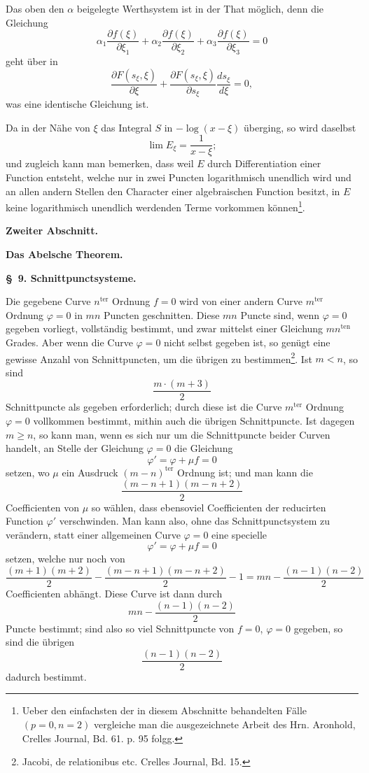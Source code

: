 \documentclass[10pt]{article}
\begin{document}
Das oben den $\alpha$ beigelegte Werthsystem ist in der That möglich, denn die Gleichung
\[
\alpha_1\frac{\partial f(\xi)}{\partial \xi_1}+\alpha_2\frac{\partial f(\xi)}{\partial \xi_2}+\alpha_3\frac{\partial f(\xi)}{\partial \xi_3}=0
\]
geht über in
\[
\frac{\partial F(s_\xi,\xi)}{\partial \xi}
+\frac{\partial F(s_\xi,\xi)}{\partial s_\xi}\frac{ds_\xi}{d\xi}=0,
\]
was eine identische Gleichung ist.

Da in der Nähe von $\xi$ das Integral $S$ in $-\log(x-\xi)$ überging, so wird daselbst
\[
\lim E_\xi=\frac{1}{x-\xi};
\]
und zugleich kann man bemerken, dass weil $E$ durch Differentiation einer Function entsteht, welche nur in zwei Puncten logarithmisch unendlich wird und an allen andern Stellen den Character einer algebraischen Function besitzt, in $E$ keine logarithmisch unendlich werdenden Terme vorkommen können\footnote{Ueber den einfachsten der in diesem Abschnitte behandelten Fälle $(p=0,n=2)$ vergleiche man die ausgezeichnete Arbeit des Hrn. Aronhold, Crelles Journal, Bd. 61. p. 95 folgg.}.

\clearpage

\begin{center}
{\large\bfseries Zweiter Abschnitt.}\par\vspace{0.8em}
{\Large\bfseries Das Abelsche Theorem.}
\end{center}

\begin{center}
{\bfseries \S\ 9. Schnittpunctsysteme.}
\end{center}

Die gegebene Curve $n^{\text{ter}}$ Ordnung $f=0$ wird von einer andern Curve $m^{\text{ter}}$ Ordnung $\varphi=0$ in $mn$ Puncten geschnitten. Diese $mn$ Puncte sind, wenn $\varphi=0$ gegeben vorliegt, vollständig bestimmt, und zwar mittelst einer Gleichung $mn^{\text{ten}}$ Grades. Aber wenn die Curve $\varphi=0$ nicht selbst gegeben ist, so genügt eine gewisse Anzahl von Schnittpuncten, um die übrigen zu bestimmen\footnote{Jacobi, de relationibus etc. Crelles Journal, Bd. 15.}. Ist $m<n$, so sind
\[
\frac{m\cdot(m+3)}{2}
\]
Schnittpuncte als gegeben erforderlich; durch diese ist die Curve $m^{\text{ter}}$ Ordnung $\varphi=0$ vollkommen bestimmt, mithin auch die übrigen Schnittpuncte. Ist dagegen $m\geq n$, so kann man, wenn es sich nur um die Schnittpuncte beider Curven handelt, an Stelle der Gleichung $\varphi=0$ die Gleichung
\[
\varphi'=\varphi+\mu f=0
\]
setzen, wo $\mu$ ein Ausdruck $(m-n)^{\text{ter}}$ Ordnung ist; und man kann die
\[
\frac{(m-n+1)(m-n+2)}{2}
\]
Coefficienten von $\mu$ so wählen, dass ebensoviel Coefficienten der reducirten Function $\varphi'$ verschwinden. Man kann also, ohne das Schnittpunctsystem zu verändern, statt einer allgemeinen Curve $\varphi=0$ eine specielle
\[
\varphi'=\varphi+\mu f=0
\]
setzen, welche nur noch von
\[
\frac{(m+1)(m+2)}{2}-\frac{(m-n+1)(m-n+2)}{2}-1
=mn-\frac{(n-1)(n-2)}{2}
\]
Coefficienten abhängt. Diese Curve ist dann durch
\[
mn-\frac{(n-1)(n-2)}{2}
\]
Puncte bestimmt; sind also so viel Schnittpuncte von $f=0$, $\varphi=0$ gegeben, so sind die übrigen
\[
\frac{(n-1)(n-2)}{2}
\]
dadurch bestimmt.
\end{document}
